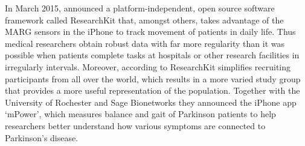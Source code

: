 In March 2015, \citeauthor{Apple_2015} announced a platform-independent, open source software framework called ResearchKit \cite{Apple_2015} that, amongst others, takes advantage of the MARG sensors in the iPhone to track movement of patients in daily life. Thus medical researchers obtain robust data with far more regularity than it was possible when patients complete tasks at hospitals or other research facilities in irregularly intervals. Moreover, according to \citeauthor{Apple_2015} ResearchKit simplifies recruiting participants from all over the world, which results in a more varied study group that provides a more useful representation of the population. Together with the University of Rochester and Sage Bionetworks they announced the iPhone app `mPower', which measures balance and gait of Parkinson patients to help researchers better understand how various symptoms are connected to Parkinson's disease.

